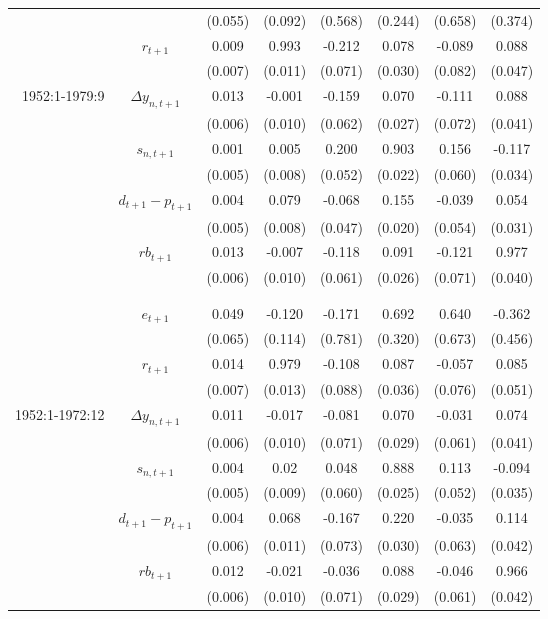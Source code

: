 \documentclass[11pt]{article}
\begin{document}
\begin{center}
\begin{longtable}{rccccccc}
  &   & (0.055) & (0.092) & (0.568) & (0.244) & (0.658) & (0.374) \\ 
  &  $r_{t+1}$ & 0.009 & 0.993 & -0.212 & 0.078 & -0.089 & 0.088 \\ 
   &  & (0.007) & (0.011) & (0.071) & (0.030) & (0.082) & (0.047) \\ 
  1952:1-1979:9 &  $\Delta y_{n,t+1}$ & 0.013 & -0.001 & -0.159 & 0.070 & -0.111 & 0.088 \\ 
   &  & (0.006) & (0.010) & (0.062) & (0.027) & (0.072) & (0.041) \\ 
  &  $s_{n,t+1}$ & 0.001 & 0.005 & 0.200 & 0.903 & 0.156 & -0.117 \\ 
   &  & (0.005) & (0.008) & (0.052) & (0.022) & (0.060) & (0.034) \\ 
  &  $d_{t+1}-p_{t+1}$ & 0.004 & 0.079 & -0.068 & 0.155 & -0.039 & 0.054 \\ 
   &  & (0.005) & (0.008) & (0.047) & (0.020) & (0.054) & (0.031) \\ 
  &  $rb_{t+1}$ & 0.013 & -0.007 & -0.118 & 0.091 & -0.121 & 0.977 \\ 
   &  & (0.006) & (0.010) & (0.061) & (0.026) & (0.071) & (0.040) \\ 
   \\ \hline \\
  &  $e_{t+1}$ & 0.049 & -0.120 & -0.171 & 0.692 & 0.640 & -0.362 \\ 
   &  & (0.065) & (0.114) & (0.781) & (0.320) & (0.673) & (0.456) \\ 
  &  $r_{t+1}$ & 0.014 & 0.979 & -0.108 & 0.087 & -0.057 & 0.085 \\ 
   &  & (0.007) & (0.013) & (0.088) & (0.036) & (0.076) & (0.051) \\ 
  1952:1-1972:12 &  $\Delta y_{n,t+1}$ & 0.011 & -0.017 & -0.081 & 0.070 & -0.031 & 0.074 \\ 
   &  & (0.006) & (0.010) & (0.071) & (0.029) & (0.061) & (0.041) \\ 
  &  $s_{n,t+1}$ & 0.004 & 0.02 & 0.048 & 0.888 & 0.113 & -0.094 \\ 
   &  & (0.005) & (0.009) & (0.060) & (0.025) & (0.052) & (0.035) \\ 
  &  $d_{t+1}-p_{t+1}$ & 0.004 & 0.068 & -0.167 & 0.220 & -0.035 & 0.114 \\ 
   &  & (0.006) & (0.011) & (0.073) & (0.030) & (0.063) & (0.042) \\ 
  &  $rb_{t+1}$ & 0.012 & -0.021 & -0.036 & 0.088 & -0.046 & 0.966 \\ 
   &  & (0.006) & (0.010) & (0.071) & (0.029) & (0.061) & (0.042) \\ 

\end{longtable}
\end{center}
\end{document}
